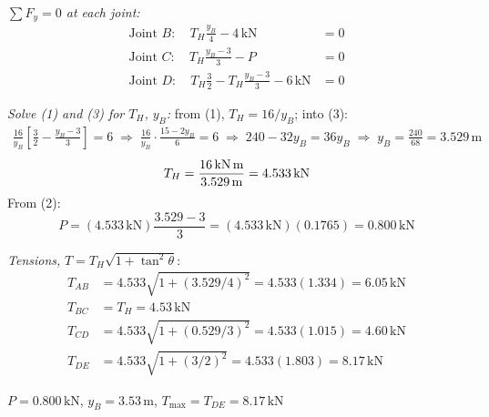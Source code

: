\documentclass[11pt]{article}
\newcommand{\un}[1]{\,\text{#1}}
\begin{document}
\textit{$\sum F_y = 0$ at each joint:}
\begin{align}
\text{Joint } B:\quad T_H\frac{y_B}{4} - 4\un{kN} &= 0 \tag{1}\\
\text{Joint } C:\quad T_H\frac{y_B - 3}{3} - P &= 0 \tag{2}\\
\text{Joint } D:\quad T_H\frac{3}{2} - T_H\frac{y_B - 3}{3} - 6\un{kN} &= 0 \tag{3}
\end{align}

\textit{Solve (1) and (3) for $T_H$, $y_B$:} from (1), $T_H = 16/y_B$; into (3):
\begin{align*}
\frac{16}{y_B}\left[\frac32 - \frac{y_B - 3}{3}\right] = 6
\;\Rightarrow\; \frac{16}{y_B}\cdot\frac{15 - 2y_B}{6} = 6
\;\Rightarrow\; 240 - 32y_B = 36y_B
\;\Rightarrow\; y_B = \frac{240}{68} = 3.529\un{m}
\end{align*}
\[
T_H = \frac{16\un{kN\,m}}{3.529\un{m}} = 4.533\un{kN}
\]
From (2):
\[
P = (4.533\un{kN})\frac{3.529 - 3}{3} = (4.533\un{kN})(0.1765) = 0.800\un{kN}
\]

\textit{Tensions,} $T = T_H\sqrt{1 + \tan^2\theta}$:
\begin{align*}
T_{AB} &= 4.533\sqrt{1 + (3.529/4)^2} = 4.533(1.334) = 6.05\un{kN}\\
T_{BC} &= T_H = 4.53\un{kN}\\
T_{CD} &= 4.533\sqrt{1 + (0.529/3)^2} = 4.533(1.015) = 4.60\un{kN}\\
T_{DE} &= 4.533\sqrt{1 + (3/2)^2} = 4.533(1.803) = 8.17\un{kN}
\end{align*}


\begin{finalanswer}
$P = 0.800\un{kN}$, \quad $y_B = 3.53\un{m}$, \quad $T_{\max} = T_{DE} = 8.17\un{kN}$
\end{finalanswer}
\end{document}
